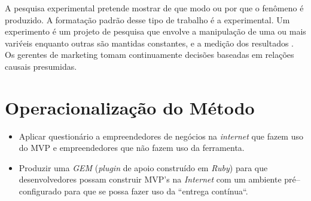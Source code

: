 A pesquisa experimental pretende mostrar de que modo ou por que o fen\^omeno \'e produzido. A formata\c{c}\~ao padr\~ao desse tipo de trabalho \'e a experimental. Um experimento \'e um projeto de pesquisa que envolve a manipula\c{c}\~ao de uma ou mais vari\'veis enquanto outras s\~ao mantidas constantes, e a medi\c{c}\~ao dos resultados \cite{churchill2009marketing} \cite{malhotra2006pesquisa}. Os gerentes de marketing tomam continuamente decis\~oes baseadas em rela\c{c}\~oes causais presumidas.

\section{Operacionaliza\c{c}\~ao do M\'etodo}




\begin{itemize}
\item Aplicar question\'ario a empreendedores de neg\'ocios na \emph{internet} que fazem uso do MVP e empreendedores que n\~ao fazem uso da ferramenta.

\item Produzir uma \emph{GEM} (\emph{plugin} de apoio constru\'ido em \emph{Ruby}) para que desenvolvedores possam construir MVP's na \emph{Internet} com um ambiente pr\'e--configurado para que se possa fazer uso da ``entrega cont\'inua``.
\end{itemize}

